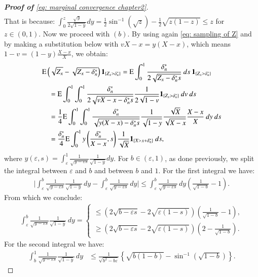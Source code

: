\begin{proof}[\hypertarget{proof of lemma 2}{\textbf{Proof of}} \eqref{eq: marginal convergence chapter2}]
\begin{align}
\end{align}
That is because: $\int_{0}^{z} \frac{\sqrt{y}}{2 \sqrt{1-y}} dy = \frac{1}{2} \sin^{-1} (\sqrt{z}) - \frac{1}{2} \sqrt{z(1-z)} \leq z$ for $z \in (0,1)$. Now we proceed with $(b)$. By using again \eqref{eq: sampling of Z} and by making a substitution below with $vX - x = y(X-x)$, which means $1-v = (1-y)\frac{X-x}{X}$, we obtain:
\begin{align*}
& \mathrm{E} \left(\sqrt{Z_x}-\sqrt{Z_x-\delta^*_n}\right) \mathbf{1}_{\{Z_x>\delta^*_n\}}=\mathrm{E}  \int_0^1 \frac{\delta^*_n}{2 \sqrt{Z_x-\delta^*_n s}} \: d s \: \mathbf{1}_{\{Z_x>\delta^*_n\}} \\
& \quad =  \mathrm{E}  \int_0^1 \int_0^1 \frac{\delta^*_n}{2 \sqrt{v X-x-\delta^*_n s}} \frac{1}{2 \sqrt{1-v}} \mathbf{1}_{\{Z_x>\delta^*_n\}} \: d v \: d s\\
& \quad = \frac{1}{4} \mathrm{E}  \int_0^1 \int_0^1 \frac{\delta^*_n}{\sqrt{y(X-x)-\delta^*_n s}} \frac{1}{\sqrt{1-y}} \frac{\sqrt{X}}{\sqrt{X-x}} \frac{X-x}{X} \: d y \: d s \\
& \quad = \frac{\delta^*_n}{4} \mathrm{E}  \int_0^1  y\left(\frac{\delta^*_n}{X-x}, s\right) \frac{1}{\sqrt{X}} \mathbf{1}_{\{X>x+\delta^*_n\}} \: d s,
\end{align*}
where $y(\varepsilon,s) = \int_{\varepsilon}^{1} \frac{1}{\sqrt{y-\varepsilon s}} \frac{1}{\sqrt{1-y}} dy$. For $b \in (\varepsilon,1)$, as done previously, we split the integral between $\varepsilon$ and $b$ and between $b$ and $1$. For the first integral we have:
\begin{align*}
    \bigg| \int_{\varepsilon}^{b} \frac{1}{\sqrt{y - \varepsilon s}} \frac{1}{\sqrt{1 - y}} \, dy - \int_{\varepsilon}^{b} \frac{1}{\sqrt{y - \varepsilon s}} \, dy\bigg| \leq \int_{\varepsilon}^{b} \frac{1}{\sqrt{y - \varepsilon s}} \, dy \left( \frac{1}{\sqrt{1-b}} -1 \right).
\end{align*}
From which we conclude:
\begin{align*}
\int_{\varepsilon}^b \frac{1}{\sqrt{y-\varepsilon s}} \frac{1}{\sqrt{1-y}} \, d y = \left\{\begin{array}{l}
\leq (2 \sqrt{b-\varepsilon s}-2 \sqrt{\varepsilon(1-s)})\left(\frac{1}{\sqrt{1-b}}-1\right), \\
\geq (2 \sqrt{b-\varepsilon s}-2 \sqrt{\varepsilon(1-s)})\left(2-\frac{1}{\sqrt{1-b}}\right).
\end{array}\right.
\end{align*}
For the second integral we have:
\begin{align*}
    \int_{b}^{1} \frac{1}{\sqrt{y-\varepsilon s}} \frac{1}{\sqrt{1-y}} \, dy &\leq \frac{1}{\sqrt{b^2 - b\varepsilon}} \left\{ \sqrt{b(1-b)} - \sin^{-1}(\sqrt{1-b}) \right\}.

\end{align*}
\end{proof}
